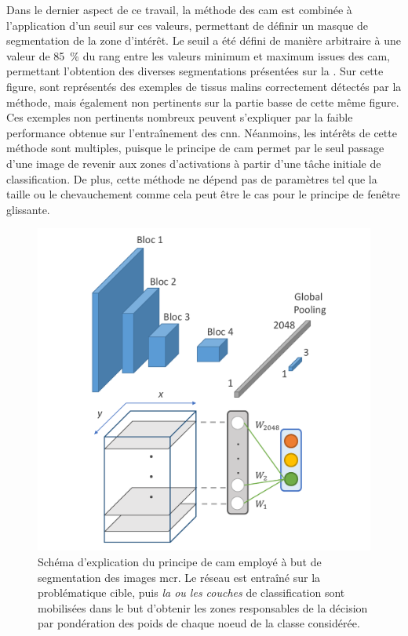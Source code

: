 Dans le dernier aspect de ce travail, la méthode des \gls{cam} est combinée à l'application d'un seuil sur ces valeurs, permettant de définir un masque de segmentation de la zone d'intérêt. Le seuil a été défini de manière arbitraire à une valeur de 85~\% du rang entre les valeurs minimum et maximum issues des \gls{cam}, permettant l'obtention des diverses segmentations présentées sur la . Sur cette figure, sont représentés des exemples de tissus malins correctement détectés par la méthode, mais également non pertinents sur la partie basse de cette même figure. Ces exemples non pertinents nombreux peuvent s'expliquer par la faible performance obtenue sur l'entraînement des \gls{cnn}. Néanmoins, les intérêts de cette méthode sont multiples, puisque le principe de \gls{cam} permet par le seul passage d'une image de revenir aux zones d'activations à partir d'une tâche initiale de classification. De plus, cette méthode ne dépend pas de paramètres tel que la taille ou le chevauchement comme cela peut être le cas pour le principe de fenêtre glissante.\par

\begin{figure}[H]
    \centering
    \includegraphics[width=\linewidth]{contents/chapter_6/resources/scheme_image_improvement_cam.pdf}
    \caption{Schéma d'explication du principe de \gls{cam} employé à but de segmentation des images \gls{mcr}. Le réseau est entraîné sur la problématique cible, puis \textit{la ou les couches} de classification sont mobilisées dans le but d'obtenir les zones responsables de la décision par pondération des poids de chaque noeud de la classe considérée.}
    \label{fig:scheme_image_improvement_cam}
\end{figure}\par

